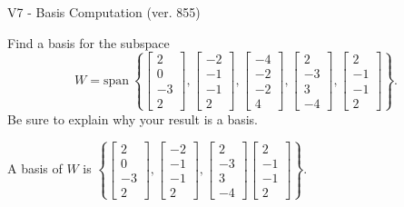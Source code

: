 \begin{exercise}
  \begin{exerciseTitle}V7 - Basis Computation (ver. 855)\end{exerciseTitle}
  \begin{exerciseStatement}
    Find a basis for the subspace 
\[W=\mathrm{span}\ \left\{\left[\begin{array}{r}
2 \\
0 \\
-3 \\
2
\end{array}\right] , \left[\begin{array}{r}
-2 \\
-1 \\
-1 \\
2
\end{array}\right] , \left[\begin{array}{r}
-4 \\
-2 \\
-2 \\
4
\end{array}\right] , \left[\begin{array}{r}
2 \\
-3 \\
3 \\
-4
\end{array}\right] , \left[\begin{array}{r}
2 \\
-1 \\
-1 \\
2
\end{array}\right]\right\}.\]
 Be sure to explain why your result is a basis.


  \end{exerciseStatement}
  \begin{exerciseAnswer}
   A basis of \(W\) is  \(\left\{\left[\begin{array}{r}
2 \\
0 \\
-3 \\
2
\end{array}\right] , \left[\begin{array}{r}
-2 \\
-1 \\
-1 \\
2
\end{array}\right] , \left[\begin{array}{r}
2 \\
-3 \\
3 \\
-4
\end{array}\right] \left[\begin{array}{r}
2 \\
-1 \\
-1 \\
2
\end{array}\right]\right\}\).
  


  \end{exerciseAnswer}
\end{exercise}